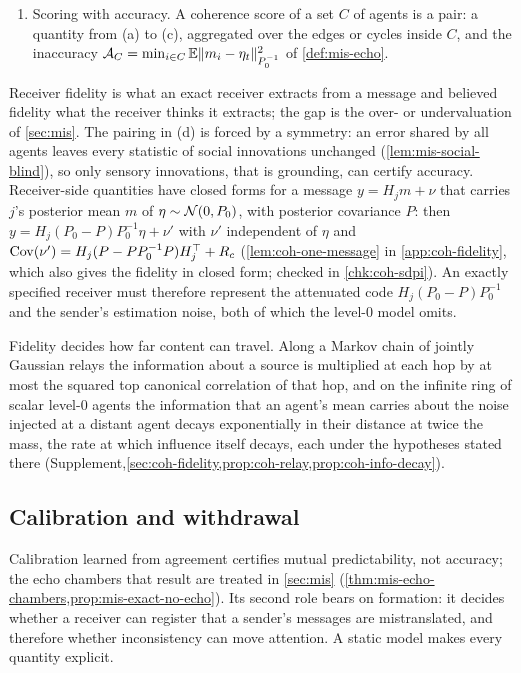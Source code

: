\begin{definition}
\begin{enumerate}
\item Scoring with accuracy. A coherence score of a set $C$ of agents is a pair: a quantity from (a) to (c), aggregated over the edges or cycles inside $C$, and the inaccuracy $\mathcal A_C=\min_{i\in C}\mathbb{E}\Vert m_i-\eta_t\Vert^2_{P_0^{-1}}$ of \cref{def:mis-echo}.
\end{enumerate}
\end{definition}

Receiver fidelity is what an exact receiver extracts from a message and believed fidelity what the receiver thinks it extracts; the gap is the over- or undervaluation of \cref{sec:mis}. The pairing in (d) is forced by a symmetry: an error shared by all agents leaves every statistic of social innovations unchanged (\cref{lem:mis-social-blind}), so only sensory innovations, that is grounding, can certify accuracy. Receiver-side quantities have closed forms for a message $y=H_jm+\nu$ that carries $j$'s posterior mean $m$ of $\eta\sim\mathcal{N}(0,P_0)$, with posterior covariance $P$: then $y=H_j(P_0-P)P_0^{-1}\eta+\nu'$ with $\nu'$ independent of $\eta$ and $\operatorname{Cov}(\nu')=H_j(P-PP_0^{-1}P)H_j^\top+R_c$ (\cref{lem:coh-one-message} in \cref{app:coh-fidelity}, which also gives the fidelity in closed form; checked in \cref{chk:coh-sdpi}). An exactly specified receiver must therefore represent the attenuated code $H_j(P_0-P)P_0^{-1}$ and the sender's estimation noise, both of which the level-0 model omits.

Fidelity decides how far content can travel. Along a Markov chain of jointly Gaussian relays the information about a source is multiplied at each hop by at most the squared top canonical correlation of that hop, and on the infinite ring of scalar level-0 agents the information that an agent's mean carries about the noise injected at a distant agent decays exponentially in their distance at twice the mass, the rate at which influence itself decays, each under the hypotheses stated there (Supplement,\cref{sec:coh-fidelity,prop:coh-relay,prop:coh-info-decay}).

\subsection{Calibration and withdrawal}\label{sec:coh-calibration}

Calibration learned from agreement certifies mutual predictability, not accuracy; the echo chambers that result are treated in \cref{sec:mis} (\cref{thm:mis-echo-chambers,prop:mis-exact-no-echo}). Its second role bears on formation: it decides whether a receiver can register that a sender's messages are mistranslated, and therefore whether inconsistency can move attention. A static model makes every quantity explicit.

